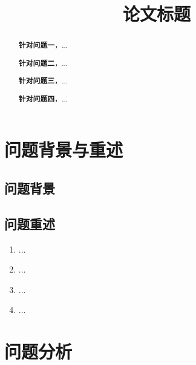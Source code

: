 \documentclass[a4paper]{article}
\title{论文标题}
\date{} %
\begin{document}
	\maketitle
	\vspace{-6em} %
	\begin{abstract}
		
		\textbf{针对问题一}，...
		
		\textbf{针对问题二}，...
		
		\textbf{针对问题三}，...
		
		\textbf{针对问题四}，...\\
		\newline
	\end{abstract}
	
	\clearpage %
	
	\section{问题背景与重述}
	\subsection{问题背景}
 
	
	\subsection{问题重述}
	\begin{enumerate}[itemindent=0.5cm]
		\item ...
		\item ...
		\item ...
		\item ...
	\end{enumerate}
	
	\section{问题分析}
\end{document}
